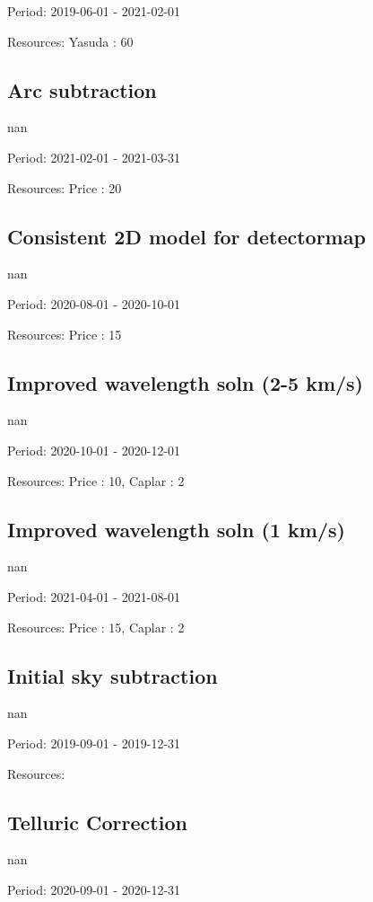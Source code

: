 Period: 2019-06-01 - 2021-02-01

Resources: Yasuda : 60

\subsection{Arc subtraction}

nan

Period: 2021-02-01 - 2021-03-31

Resources: Price : 20

\subsection{Consistent 2D model for detectormap}

nan

Period: 2020-08-01 - 2020-10-01

Resources: Price : 15

\subsection{Improved wavelength soln (2-5 km/s)}

nan

Period: 2020-10-01 - 2020-12-01

Resources: Price : 10, Caplar : 2

\subsection{Improved wavelength soln (1 km/s)}

nan

Period: 2021-04-01 - 2021-08-01

Resources: Price : 15, Caplar : 2

\subsection{Initial sky subtraction}

nan

Period: 2019-09-01 - 2019-12-31

Resources: 

\subsection{Telluric Correction}

nan

Period: 2020-09-01 - 2020-12-31

